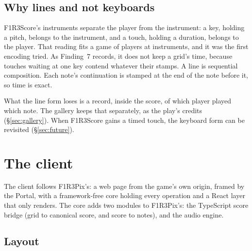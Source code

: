 \documentclass[11pt,a4paper]{article}
\begin{document}
\subsection{Why lines and not keyboards}

F1R3Score's instruments separate the player from the instrument: a key, holding a pitch,
belongs to the instrument, and a touch, holding a duration, belongs to the player. That reading
fits a game of players at instruments, and it was the first encoding tried. As Finding~7
records, it does not keep a grid's time, because touches waiting at one key contend whatever
their stamps. A line is sequential composition. Each note's continuation is stamped at the end
of the note before it, so time is exact.

What the line form loses is a record, inside the score, of which player played which note. The
gallery keeps that separately, as the play's credits (\S\ref{sec:gallery}). When F1R3Score
gains a timed touch, the keyboard form can be revisited (\S\ref{sec:future}).
\section{The client}\label{sec:client}

The client follows F1R3Pix's: a web page from the game's own origin, framed by the Portal, with
a framework-free core holding every operation and a React layer that only renders. The core
adds two modules to F1R3Pix's: the TypeScript score bridge (grid to canonical score, and score
to notes), and the audio engine.

\subsection{Layout}
\end{document}
